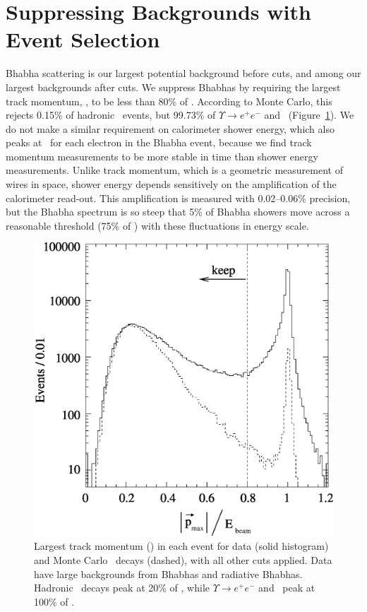 \documentclass{cornell}
\begin{document}
\section{Suppressing Backgrounds with Event Selection}

Bhabha scattering is our largest potential background before cuts, and
among our largest backgrounds after cuts.  We suppress Bhabhas by
requiring the largest track momentum, \pmax, to be less than 80\% of
\ebeam.  According to Monte Carlo, this rejects 0.15\% of hadronic
\ups\ events, but 99.73\% of $\Upsilon \to e^+e^-$ and \mumu\
(Figure~\ref{pmax}).  We do not make a similar requirement on
calorimeter shower energy, which also peaks at \ebeam\ for each
electron in the Bhabha event, because we find track momentum
measurements to be more stable in time than shower energy
measurements.  Unlike track momentum, which is a geometric measurement
of wires in space, shower energy depends sensitively on the
amplification of the calorimeter read-out.  This amplification is
measured with 0.02--0.06\% precision, but the Bhabha spectrum is so
steep that 5\% of Bhabha showers move across a reasonable
threshold (75\% of \ebeam) with these fluctuations in energy scale.

\begin{figure}[p]
  \begin{center}
    \includegraphics[width=\linewidth]{pmax}
  \end{center}
  \caption[Largest track momentum distribution]{\label{pmax} Largest
  track momentum (\pmax) in each event for data (solid histogram) and
  Monte Carlo \ups\ decays (dashed), with all other cuts applied.
  Data have large backgrounds from Bhabhas and radiative Bhabhas.
  Hadronic \ups\ decays peak at 20\% of \ebeam, while $\Upsilon \to
  e^+e^-$ and \mumu\ peak at 100\% of \ebeam.}
\end{figure}
\end{document}

